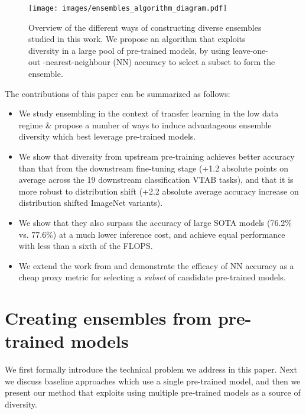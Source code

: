 \documentclass{article} \usepackage{iclr2021_conference,times}
\begin{document}
\begin{figure}
    \centering
    \vspace{-1ex}
    \texttt{[image: images/ensembles\_algorithm\_diagram.pdf]}
\caption{Overview of the different ways of constructing diverse ensembles studied in this work. We propose an algorithm that
     exploits diversity in a large pool of pre-trained models, by using leave-one-out -nearest-neighbour (NN) accuracy to select a subset to form the ensemble.}
\label{fig:algorithm}
\end{figure}

The contributions of this paper can be summarized as follows:
\begin{itemize}[leftmargin=*] \item We study ensembling in the context of transfer learning in the low data regime \& propose a number of ways to induce advantageous ensemble diversity which best leverage pre-trained models.
     \item We show that diversity from upstream pre-training achieves better accuracy than that from the downstream fine-tuning stage (+1.2 absolute points on average across the 19 downstream classification VTAB tasks), and that it is more robust to distribution shift (+2.2 absolute average accuracy increase on distribution shifted ImageNet variants).
     \item We show that they also surpass the accuracy of large SOTA models (76.2\% vs. 77.6\%) at a much lower inference cost, and achieve equal performance with less than a sixth of the FLOPS.\item We extend the work from \citet{puigcerver2020experts} and demonstrate the efficacy of NN accuracy as a cheap proxy metric for selecting a \emph{subset} of candidate pre-trained models.
\end{itemize}

 


\section{Creating ensembles from pre-trained models}
We first formally introduce the technical problem we address in this paper.
Next we discuss baseline approaches which use a single pre-trained model, and then we present our method that exploits using multiple pre-trained models as a source of diversity.
\end{document}

